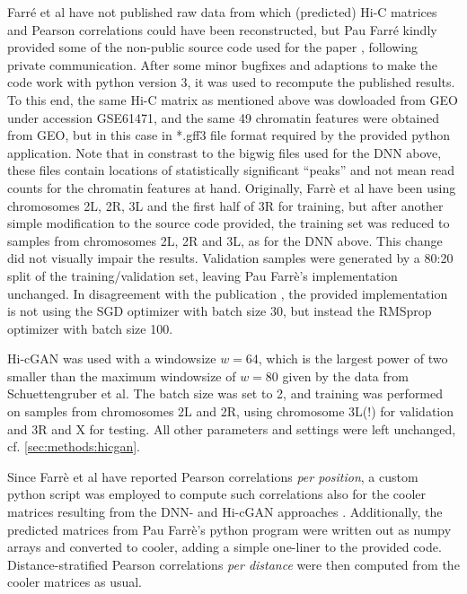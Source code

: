 Farr\'e et al have not published raw data from which (predicted) Hi-C matrices and Pearson correlations could have been reconstructed,
but Pau Farr\'e kindly provided some of the non-public source code used for the paper \cite{Farre2018a},
following private communication.
After some minor bugfixes and adaptions to make the code work with python version 3, it was used to recompute the published results.
To this end, the same Hi-C matrix as mentioned above was dowloaded from GEO under accession GSE61471,
and the same 49 chromatin features were obtained from GEO, but in this case in *.gff3 file format required by the provided python application.
Note that in constrast to the bigwig files used for the DNN above, these files contain locations of statistically significant ``peaks''
and not mean read counts for the chromatin features at hand.
Originally, Farrè et al have been using chromosomes 2L, 2R, 3L and the first half of 3R for training, 
but after another simple modification to the source code provided, the training set was reduced to samples from chromosomes 2L, 2R and 3L,
as for the DNN above. This change did not visually impair the results. 
Validation samples were generated by a 80:20 split of the training/validation set, leaving Pau Farrè's implementation unchanged.
In disagreement with the publication \cite{Farre2018a}, the provided implementation is not using the SGD optimizer with batch size 30,
but instead the RMSprop optimizer with batch size 100.

Hi-cGAN was used with a windowsize $w=64$, which is the largest power of two 
smaller than the maximum windowsize of $w=80$ given by the data from Schuettengruber et al.
The batch size was set to 2, and training was performed on samples from chromosomes 2L and 2R, 
using chromosome 3L(!) for validation and 3R and X for testing.
All other parameters and settings were left unchanged, cf. \cref{sec:methods:hicgan}.

Since Farrè et al have reported Pearson correlations \emph{per position}, a custom python script 
was employed to compute such correlations also for the cooler matrices resulting from the DNN- and Hi-cGAN approaches \cite[scripts/corr\_per\_pos.py]{Krauth2021b}.
Additionally, the predicted matrices from Pau Farrè's python program were written out as numpy arrays and converted to cooler, 
adding a simple one-liner to the provided code. 
Distance-stratified Pearson correlations \emph{per distance} were then computed from the cooler matrices as usual.

